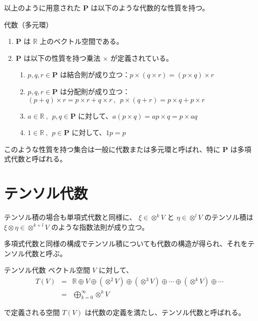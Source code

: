 \documentclass[uplatex,a4j,12pt,dvipdfmx]{jsarticle}
\begin{document}
以上のように用意された $\mathbf{P}$ は以下のような代数的な性質を持つ。

\begin{itembox}[l]{代数（多元環）}
	\begin{enumerate}
		\item $\mathbf{P}$ は $\mathbb{R}$ 上のベクトル空間である。
		\item $\mathbf{P}$ は以下の性質を持つ乗法 $\times$ が定義されている。
		      \begin{enumerate}
			      \item $p,q,r \in \mathbf{P}$ は結合則が成り立つ：$p \times (q \times r) = (p \times q) \times r$
			      \item $p,q,r \in \mathbf{P}$ は分配則が成り立つ：$(p + q) \times r = p \times r + q \times r \ , \ \ p \times (q + r) = p \times q + p \times r$
			      \item $a \in \mathbb{R} \ , \ \ p,q \in \mathbf{P}$ に対して、$a (p \times q) = a p \times q = p \times a q$
			      \item $1 \in \mathbb{R} \ , \ \ p \in \mathbf{P}$ に対して、$1p=p$
		      \end{enumerate}
	\end{enumerate}
\end{itembox}

このような性質を持つ集合は一般に代数または多元環と呼ばれ、特に $\mathbf{P}$ は多項式代数と呼ばれる。


\section{テンソル代数}

テンソル積の場合も単項式代数と同様に、
$\xi \in \otimes^{k} V$
と
$\eta \in \otimes^{l} V$
のテンソル積は
$\xi \otimes \eta \in \otimes^{k+l} V$
のような指数法則が成り立つ。

多項式代数と同様の構成でテンソル積についても代数の構造が得られ、それをテンソル代数と呼ぶ。

\begin{itembox}[l]{テンソル代数}
	ベクトル空間 $V$ に対して、
	\[
		\begin{array}{rcl}
			T(V) & = & \mathbb{R} \oplus V \oplus ( \otimes^{2} V ) \oplus ( \otimes^{3} V ) \oplus \cdots \oplus ( \otimes^{k} V ) \oplus \cdots \\
			     & = & \displaystyle \bigoplus_{k=0}^{\infty} \otimes^{k} V
		\end{array}
	\]

	で定義される空間 $T(V)$ は代数の定義を満たし、テンソル代数と呼ばれる。
\end{itembox}
\end{document}
